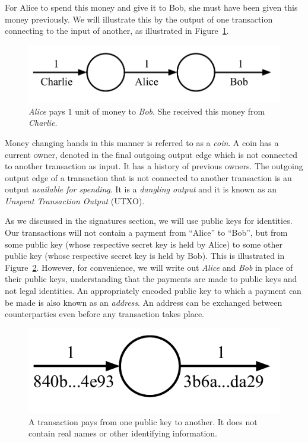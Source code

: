 For Alice to spend this money and give it to Bob, she must have been given this money previously.
We will illustrate this by the output of one transaction connecting to the input of another,
as illustrated in Figure~\ref{fig.utxo-transaction-chain}.

\begin{figure}[h]
    \centering
    \includegraphics[width=0.55 \columnwidth,keepaspectratio]{figures/utxo-transaction-chain.pdf}
    \caption{\emph{Alice} pays $1$ unit of money to \emph{Bob}. She received this money from \emph{Charlie}.}
    \label{fig.utxo-transaction-chain}
\end{figure}

Money changing hands in this manner is referred to as a \emph{coin}. A coin has a current owner,
denoted in the final outgoing output edge which is not connected to another transaction as input.
It has a history of previous owners. The outgoing output
edge of a transaction that is not connected to another transaction is an output \emph{available for spending}.
It is a \emph{dangling output} and
it is known as an \emph{Unspent Transaction Output} (UTXO).

As we discussed in the signatures section, we will use public keys for identities. Our transactions
will not contain a payment from ``Alice'' to ``Bob'', but from some public key (whose respective secret key
is held by Alice) to some other public key (whose respective secret key is held by Bob). This is
illustrated in Figure~\ref{fig.utxo-transaction-keys}. However, for convenience, we will write out
\emph{Alice} and \emph{Bob} in place of their public keys, understanding that the payments are
made to public keys and not legal identities. An appropriately encoded public key to which a payment can be made is
also known as an \emph{address}. An address can be exchanged between counterparties
even before any transaction takes place.

\begin{figure}[h]
    \centering
    \includegraphics[width=0.35 \columnwidth,keepaspectratio]{figures/utxo-transaction-keys.pdf}
    \caption{A transaction pays from one public key to another. It does not contain real names
             or other identifying information.}
    \label{fig.utxo-transaction-keys}
\end{figure}

